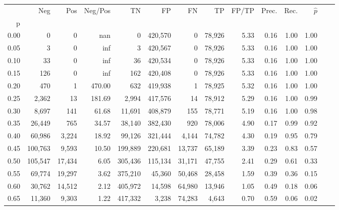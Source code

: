 \begin{tabular}{rrrrrrrrrrrrrr}
\toprule
{} &      Neg &     Pos & Neg/Pos &       TN &       FP &      FN &      TP & FP/TP & Prec. &  Rec. & $\hat{p}$ \\
p    &          &         &         &          &          &         &         &       &       &       &           \\
\midrule
0.00 &        0 &       0 &     nan &        0 &  420,570 &       0 &  78,926 &  5.33 &  0.16 &  1.00 &      1.00 \\
0.05 &        3 &       0 &     inf &        3 &  420,567 &       0 &  78,926 &  5.33 &  0.16 &  1.00 &      1.00 \\
0.10 &       33 &       0 &     inf &       36 &  420,534 &       0 &  78,926 &  5.33 &  0.16 &  1.00 &      1.00 \\
0.15 &      126 &       0 &     inf &      162 &  420,408 &       0 &  78,926 &  5.33 &  0.16 &  1.00 &      1.00 \\
0.20 &      470 &       1 &  470.00 &      632 &  419,938 &       1 &  78,925 &  5.32 &  0.16 &  1.00 &      1.00 \\
0.25 &    2,362 &      13 &  181.69 &    2,994 &  417,576 &      14 &  78,912 &  5.29 &  0.16 &  1.00 &      0.99 \\
0.30 &    8,697 &     141 &   61.68 &   11,691 &  408,879 &     155 &  78,771 &  5.19 &  0.16 &  1.00 &      0.98 \\
0.35 &   26,449 &     765 &   34.57 &   38,140 &  382,430 &     920 &  78,006 &  4.90 &  0.17 &  0.99 &      0.92 \\
0.40 &   60,986 &   3,224 &   18.92 &   99,126 &  321,444 &   4,144 &  74,782 &  4.30 &  0.19 &  0.95 &      0.79 \\
0.45 &  100,763 &   9,593 &   10.50 &  199,889 &  220,681 &  13,737 &  65,189 &  3.39 &  0.23 &  0.83 &      0.57 \\
0.50 &  105,547 &  17,434 &    6.05 &  305,436 &  115,134 &  31,171 &  47,755 &  2.41 &  0.29 &  0.61 &      0.33 \\
0.55 &   69,774 &  19,297 &    3.62 &  375,210 &   45,360 &  50,468 &  28,458 &  1.59 &  0.39 &  0.36 &      0.15 \\
0.60 &   30,762 &  14,512 &    2.12 &  405,972 &   14,598 &  64,980 &  13,946 &  1.05 &  0.49 &  0.18 &      0.06 \\
0.65 &   11,360 &   9,303 &    1.22 &  417,332 &    3,238 &  74,283 &   4,643 &  0.70 &  0.59 &  0.06 &      0.02 \\

\end{tabular}
